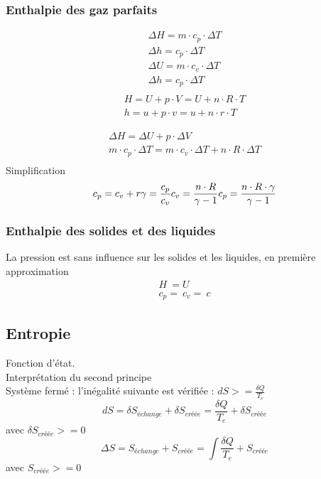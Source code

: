 	\subsubsection{Enthalpie des gaz parfaits} 
	\begin{eqnarray}
	\Delta H = m \cdot c_p \cdot \Delta T\\
	\Delta h = c_p \cdot \Delta T\\
	\Delta U = m \cdot c_v \cdot \Delta T\\
	\Delta h = c_p \cdot \Delta T\\
	\end{eqnarray}
	\begin{eqnarray}
	H = U + p \cdot V = U + n \cdot R \cdot T\\
	h = u + p \cdot v = u + n \cdot r \cdot T
	\end{eqnarray}
	
	\begin{eqnarray}
	\Delta H = \Delta U + p \cdot \Delta V\\
	m \cdot c_p \cdot \Delta T = m \cdot c_v \cdot \Delta T + n \cdot R \cdot \Delta T\\
	\end{eqnarray}
	Simplification
	\begin{equation}
	c_p =  c_v  + r\\
	\gamma = \frac{c_p}{c_v}\\
	c_v = \frac{n \cdot R}{\gamma -1}\\
	c_p = \frac{n \cdot R \cdot \gamma}{\gamma -1}
	\end{equation}
	\subsubsection{Enthalpie des solides et des liquides}
	La pression est sans influence sur les solides et les liquides, en première approximation
	\begin{eqnarray}
	H ~= U\\
	c_p =~ c_v =~ c
	\end{eqnarray}
	\subsection{Entropie}
	Fonction d'état.\\
	Interprétation du second principe\\
	Système fermé : l'inégalité suivante est vérifiée : $dS >= \frac{\delta Q}{T_e}$
	\begin{equation}
	dS = \delta S_{échange}+ \delta S_{créée}= \frac{\delta Q}{T_e}+ \delta S_{créée}
	\end{equation}
	avec $\delta S_{créée} >= 0$
	\begin{equation}
	\Delta S =S_{échange}+S_{créée}= \int \frac{\delta Q}{T_e}+S_{créée}
	\end{equation}
	avec $ S_{créée} >= 0$
	
